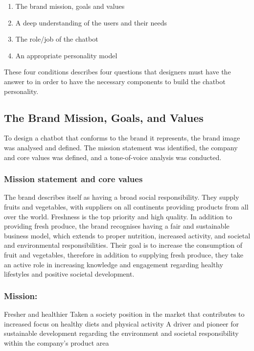 \begin{enumerate}
    \item The brand mission, goals and values
    \item A deep understanding of the users and their needs %
    \item The role/job of the chatbot
    \item An appropriate personality model
\end{enumerate}

These four conditions describes four questions that designers must have the answer to in order to have the necessary components to build the chatbot personality.

\vspace{5mm} %

    \subsection{The Brand Mission, Goals, and Values}
    To design a chatbot that conforms to the brand it represents, the brand image was analysed and defined. The mission statement was identified, the company and core values was defined, and a tone-of-voice analysis was conducted.
    
\vspace{2,5mm}
    
        \subsubsection{Mission statement and core values}
 
        The brand describes itself as having a broad social responsibility. They supply fruits and vegetables, with suppliers on all continents providing products from all over the world. Freshness is the top priority and high quality. In addition to providing fresh produce, the brand recognises having a fair and sustainable business model, which extends to proper nutrition, increased activity, and societal and environmental responsibilities. Their goal is to increase the consumption of fruit and vegetables, therefore in addition to supplying fresh produce, they take an active role in increasing knowledge and engagement regarding healthy lifestyles and positive societal development.
 
\vspace{2,5mm}
  
        \subsubsection{Mission:}
        Fresher and healthier 
        Taken a society position in the  market that contributes to increased focus on healthy diets and physical activity
        A driver and pioneer for sustainable development regarding the environment and societal responsibility within the company’s product area
        

